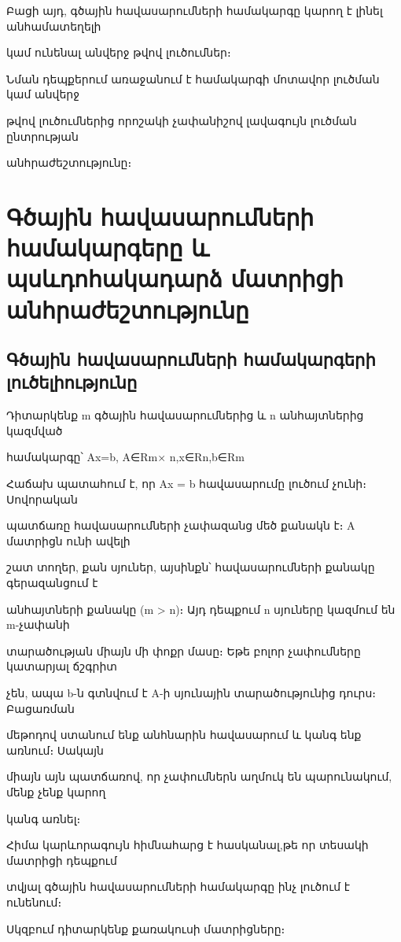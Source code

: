 \documentclass[11pt,a4paper]{article}
\begin{document}
Բացի այդ, գծային հավասարումների համակարգը կարող է լինել անհամատեղելի

կամ ունենալ անվերջ թվով լուծումներ։




Նման դեպքերում առաջանում է համակարգի մոտավոր լուծման կամ անվերջ

թվով լուծումներից որոշակի չափանիշով լավագույն լուծման ընտրության

անհրաժեշտությունը։

\section{Գծային հավասարումների համակարգերը և պսևդոհակադարձ մատրիցի անհրաժեշտությունը}

\subsection{Գծային հավասարումների համակարգերի լուծելիությունը}

Դիտարկենք m գծային հավասարումներից և n անհայտներից կազմված

համակարգը՝ Ax=b, A∈Rm× n,x∈Rn,b∈Rm




Հաճախ պատահում է, որ Ax = b հավասարումը լուծում չունի։ Սովորական

պատճառը հավասարումների չափազանց մեծ քանակն է։ A մատրիցն ունի ավելի

շատ տողեր, քան սյուներ, այսինքն՝ հավասարումների քանակը գերազանցում է

անհայտների քանակը (m > n)։ Այդ դեպքում n սյուները կազմում են m-չափանի

տարածության միայն մի փոքր մասը։ Եթե բոլոր չափումները կատարյալ ճշգրիտ

չեն, ապա b-ն գտնվում է A-ի սյունային տարածությունից դուրս։ Բացառման

մեթոդով ստանում ենք անհնարին հավասարում և կանգ ենք առնում։ Սակայն

միայն այն պատճառով, որ չափումներն աղմուկ են պարունակում, մենք չենք կարող

կանգ առնել։




Հիմա կարևորագույն հիմնահարց է հասկանալ,թե որ տեսակի մատրիցի դեպքում

տվյալ գծային հավասարումների համակարգը ինչ լուծում է ունենում։




Սկզբում դիտարկենք քառակուսի մատրիցները։
\end{document}
